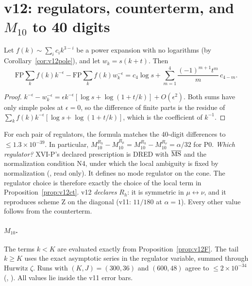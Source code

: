 \section{v12: regulators, counterterm, and \texorpdfstring{\(M_{10}\)}{M10} to 40 digits}
\label{sec:v12reg}

\begin{proposition}
\label{prop:v12ct}
Let \(f(k)\sim\sum_ic_ik^{3-i}\) be a power expansion with no
logarithms (by Corollary~\ref{cor:v12pole}), and let
\(w_k=s(k+t)\). Then
\[
\mathrm{FP}\sum_kf(k)k^{-\epsilon}-\mathrm{FP}\sum_kf(k)w_k^{-\epsilon}
=c_4\log s+\sum_{m=1}^{4}\frac{(-1)^{m+1}t^m}{m}\,c_{4-m}.
\]
\end{proposition}
\begin{proof}
\(k^{-\epsilon}-w_k^{-\epsilon}=\epsilon k^{-\epsilon}[\log
s+\log(1+t/k)]+O(\epsilon^2)\). Both sums have only simple poles at
\(\epsilon=0\), so the difference of finite parts is the residue of
\(\sum_kf(k)k^{-\epsilon}[\log s+\log(1+t/k)]\), which is the
coefficient of \(k^{-1}\).
\end{proof}
For each pair of regulators, the formula matches the 40-digit
differences to \(\le1.3\times10^{-39}\). In particular,
\(M_{10}^{R_h}-M_{10}^{R_\mu}=M_{10}^{R_h}-M_{10}^{R_\nu}=\alpha/32\)
for P0. \emph{Which regulator?} XVI-P's declared prescription is
DRED with \(\overline{\rm MS}\) and the normalization condition N4,
under which the local ambiguity is fixed by normalization
(, read only). It
defines no mode regulator on the cone. The regulator choice is
therefore exactly the choice of the local term in
Proposition~\ref{prop:v12ct}. v12 \emph{declares} \(R_h\): it is
symmetric in \(\mu\leftrightarrow\nu\), and it reproduces scheme Z on
the diagonal (v11: \(11/180\) at \(\alpha=1\)). Every other value
follows from the counterterm.

\paragraph{\(M_{10}\).} The terms \(k<K\) are evaluated exactly from
Proposition~\ref{prop:v12F}. The tail \(k\ge K\) uses the exact
asymptotic series in the regulator variable, summed through Hurwitz
\(\zeta\). Runs with \((K,J)=(300,36)\) and \((600,48)\) agree to
\(\le2\times10^{-34}\) (,
). All values lie inside the
v11 error bars.

